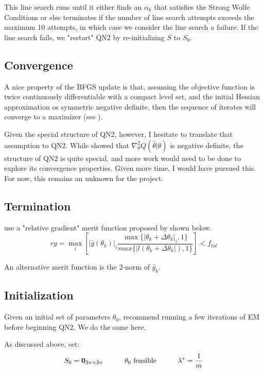 \documentclass[letter,12pt]{article}
\begin{document}
This line search runs until it either finds an $\alpha_k$ that satisfies the Strong Wolfe Conditions or else terminates if the number of line search attempts exceeds the maximum 10 attempts, in which case we consider the line search a failure.  If the line search fails, we "restart" QN2 by re-initializing $S$ to $S_0$.

\subsection{Convergence} \label{section:qn2convergence}

A nice property of the BFGS update is that, assuming the objective function is twice continuously differentiable with a compact level set, and the initial Hessian approximation os symmetric negative definite, then the sequence of iterates will converge to a maximizer (see \cite{nocedalwright_BFGS}).  

Given the special structure of QN2, however, I hesitate to translate that assumption to QN2.  While \cite{jamshidianj97} showed that $\nabla_\theta^2Q(\hat{\theta}|\hat{\theta})$ is negative definite, the structure of QN2 is quite special, and more work would need to be done to explore its convergence properties.  Given more time, I would have pursued this.  For now, this remains an unknown for the project.

\subsection{Termination}

\cite{jamshidianj97} use a "relative gradient" merit function proposed by \cite{khalfan93} shown below.
\begin{equation} \label{eq:rg}
rg = \max_i
\left[
|\bar{g}(\theta_k)|_i
\frac
{\max\{|\theta_k + \Delta \theta_k|_i,1\}}
{max\{|l(\theta_k + \Delta \theta_k|),1\}}
\right]
< f_{tol}
\end{equation}

An alternative merit function is the 2-norm of $\bar{g}_k$.

\subsection{Initialization}

Given an initial set of parameters $\theta_0$, \cite{jamshidianj93} recommend running a few iterations of EM before beginning QN2.  We do the same here.

As discussed above, set:
\[
S_0 = \boldsymbol{0}_{2n \times 2n}
\indent \indent
\theta_0 \text{ feasible}
\indent \indent
\lambda^* = \frac{1}{m}
\]
\end{document}
